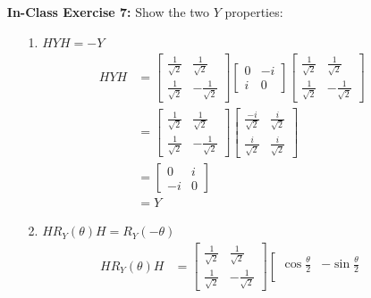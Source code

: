 \documentclass[main.tex]{subfiles}
\begin{document}
\begin{enumerate}
\item[] \textbf{In-Class Exercise 7:} Show the two $Y$ properties:
\begin{enumerate}
    \item [1.] $H Y H=-Y$
    \begin{align*}
        H Y H   & = \left[\begin{array}{ll}\frac{1}{\sqrt{2}} & \frac{1}{\sqrt{2}} \\
                \frac{1}{\sqrt{2}} & -\frac{1}{\sqrt{2}}\end{array}\right]
                \left[\begin{array}{ll}0 & -i\\i & 0\end{array}\right]
                \left[\begin{array}{ll}\frac{1}{\sqrt{2}} & \frac{1}{\sqrt{2}} \\
                \frac{1}{\sqrt{2}} & -\frac{1}{\sqrt{2}}\end{array}\right]\\
                & = \left[\begin{array}{ll}\frac{1}{\sqrt{2}} & \frac{1}{\sqrt{2}} \\
                \frac{1}{\sqrt{2}} & -\frac{1}{\sqrt{2}}\end{array}\right]
                \left[\begin{array}{ll}\frac{-i}{\sqrt{2}} & \frac{i}{\sqrt{2}} \\
                \frac{i}{\sqrt{2}} & \frac{i}{\sqrt{2}}\end{array}\right]\\
                & = \left[\begin{array}{ll}0 & i\\-i & 0\end{array}\right]\\
                & = Y
    \end{align*}
    \item [2.] $H R_{Y}(\theta) H=R_{Y}(-\theta)$
    \begin{align*}
        H R_{Y}(\theta) H   & = \left[\begin{array}{ll}\frac{1}{\sqrt{2}} & \frac{1}{\sqrt{2}} \\
                            \frac{1}{\sqrt{2}} & -\frac{1}{\sqrt{2}}\end{array}\right]
                            \left[\begin{array}{ll}\cos \frac{\theta}{2} & -\sin \frac{\theta}{2} \\

\end{array}
\end{align*}
\end{enumerate}
\end{enumerate}
\end{document}
